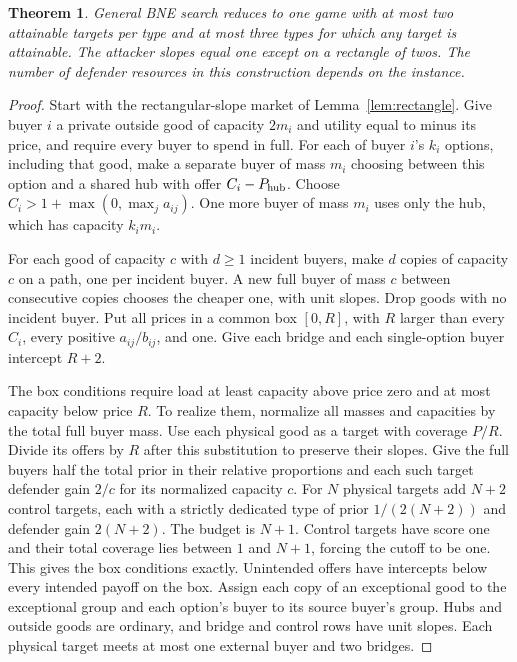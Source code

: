 \documentclass[11pt,oneside,openany,notitlepage]{report}
\newtheorem{theorem}{Theorem}[chapter]
\begin{document}
\begin{theorem}\label{thm:degree}
General BNE search reduces to one game with at most two attainable targets
per type and at most three types for which any target is attainable. The
attacker slopes equal one except on a rectangle of twos. The number of
defender resources in this construction depends on the instance.
\end{theorem}
\begin{proof}
Start with the rectangular-slope market of Lemma~\ref{lem:rectangle}.
Give buyer \(i\) a private outside good of capacity \(2m_i\) and utility
equal to minus its price, and require every buyer to spend in full.
For each of buyer \(i\)'s \(k_i\) options, including that good, make a
separate buyer of mass \(m_i\) choosing between this option and a shared
hub with offer \(C_i-P_{\rm hub}\). Choose
\(C_i>1+\max(0,\max_j a_{ij})\). One more buyer of mass \(m_i\) uses
only the hub, which has capacity \(k_i m_i\).

For each good of capacity \(c\) with \(d\ge1\) incident buyers, make \(d\)
copies of capacity \(c\) on a path, one per incident buyer. A new full
buyer of mass \(c\) between consecutive copies chooses the cheaper one,
with unit slopes. Drop goods with no incident buyer. Put all prices in
a common box \([0,R]\), with \(R\) larger than every \(C_i\), every positive
\(a_{ij}/b_{ij}\), and one. Give each bridge and each single-option buyer
intercept \(R+2\).

The box conditions require load at least capacity above price zero and at
most capacity below price \(R\). To realize them, normalize all masses
and capacities by the total full buyer mass. Use each physical good as
a target with coverage \(P/R\). Divide its offers by \(R\) after this
substitution to preserve their slopes. Give the full buyers half the
total prior in their relative proportions and each such target defender
gain \(2/c\) for its normalized capacity \(c\). For \(N\) physical
targets add \(N+2\) control targets, each with a strictly dedicated type
of prior \(1/(2(N+2))\) and defender gain \(2(N+2)\). The budget is \(N+1\).
Control targets have score one and their total coverage lies between
\(1\) and \(N+1\), forcing the cutoff to be one. This gives the box
conditions exactly. Unintended offers have intercepts below every
intended payoff on the box. Assign each copy of an exceptional good to
the exceptional group and each option's buyer to its source buyer's
group. Hubs and outside goods are ordinary, and bridge and control rows
have unit slopes. Each physical target meets at most one external buyer
and two bridges.


\end{proof}
\end{document}
